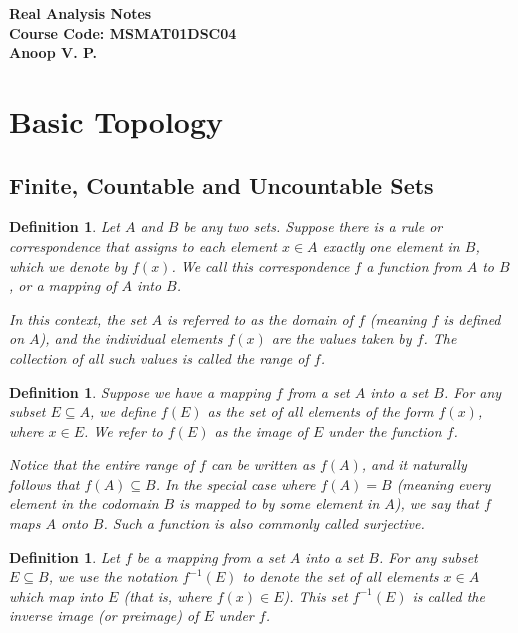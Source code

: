 \documentclass{article}
\theoremstyle{mythm}
\newtheorem{definition}[theorem]{Definition}
\begin{document}
\begin{center}
\textbf{\Large Real Analysis Notes} \\[0.5em]
\textbf{Course Code: MSMAT01DSC04} \\[0.5em]
\textbf{Anoop V. P.}
\end{center}

\vspace{1em}

\section{Basic Topology}

\subsection{Finite, Countable and Uncountable Sets}

\begin{definition}
Let $A$ and $B$ be any two sets. Suppose there is a rule or correspondence that assigns to each element $x \in A$ exactly one element in $B$, which we denote by $f(x)$. We call this correspondence $f$ a \textit{function} from $A$ to $B$, or a \textit{mapping} of $A$ into $B$. 

In this context, the set $A$ is referred to as the \textit{domain} of $f$ (meaning $f$ is defined on $A$), and the individual elements $f(x)$ are the \textit{values} taken by $f$. The collection of all such values is called the \textit{range} of $f$.
\end{definition}

\begin{definition}
Suppose we have a mapping $f$ from a set $A$ into a set $B$. For any subset $E \subseteq A$, we define $f(E)$ as the set of all elements of the form $f(x)$, where $x \in E$. We refer to $f(E)$ as the \textit{image} of $E$ under the function $f$. 

Notice that the entire range of $f$ can be written as $f(A)$, and it naturally follows that $f(A) \subseteq B$. In the special case where $f(A) = B$ (meaning every element in the codomain $B$ is mapped to by some element in $A$), we say that $f$ maps $A$ \textit{onto} $B$. Such a function is also commonly called \textit{surjective}.
\end{definition}
\begin{definition}
Let $f$ be a mapping from a set $A$ into a set $B$. For any subset $E \subseteq B$, we use the notation $f^{-1}(E)$ to denote the set of all elements $x \in A$ which map into $E$ (that is, where $f(x) \in E$). This set $f^{-1}(E)$ is called the \textit{inverse image} (or preimage) of $E$ under $f$. 
\end{definition}
\end{document}
